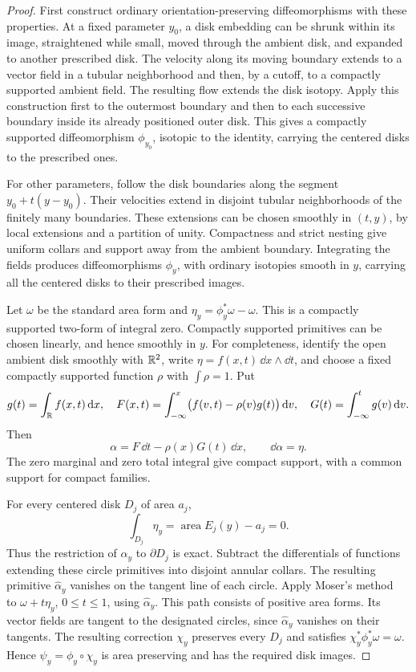 \begin{proof}
First construct ordinary orientation-preserving diffeomorphisms with
these properties. At a fixed parameter \(y_0\), a disk embedding can
be shrunk within its image, straightened while small, moved through
the ambient disk, and expanded to another prescribed disk. The
velocity along its moving boundary extends to a vector field in a
tubular neighborhood and then, by a cutoff, to a compactly supported
ambient field. The resulting flow extends the disk isotopy.
Apply this construction first to the outermost boundary and then to
each successive boundary inside its already positioned outer disk.
This gives a compactly supported diffeomorphism \(\phi_{y_0}\),
isotopic to the identity, carrying the centered disks to the prescribed
ones.

For other parameters, follow the disk boundaries along the segment
\(y_0+t(y-y_0)\). Their velocities extend in disjoint tubular
neighborhoods of the finitely many boundaries. These extensions can
be chosen smoothly in \((t,y)\), by local extensions and a partition
of unity. Compactness and strict nesting give uniform collars and
support away from the ambient boundary. Integrating the fields
produces diffeomorphisms \(\phi_y\), with ordinary isotopies smooth in
\(y\), carrying all the centered disks to their prescribed images.

Let \(\omega\) be the standard area form and
\(\eta_y=\phi_y^*\omega-\omega\).
This is a compactly supported two-form of integral zero.
Compactly supported primitives can be chosen linearly, and hence
smoothly in \(y\). For completeness, identify the open ambient disk
smoothly with \(\mathbb R^2\), write \(\eta=f(x,t)\,\dd x\wedge\dd t\),
and choose a fixed compactly supported function \(\rho\) with
\(\int\rho=1\). Put
\[
 g(t)=\int_\mathbb R f(x,t)\,\mathrm d x,\quad
 F(x,t)=\int_{-\infty}^x\bigl(f(v,t)-\rho(v)g(t)\bigr)\,\mathrm d v,
 \quad G(t)=\int_{-\infty}^t g(v)\,\mathrm d v.
\]
Then
\[
 \alpha=F\,\dd t-\rho(x)G(t)\,\dd x,\qquad
 \dd\alpha=\eta.
\]
The zero marginal and zero total integral give compact support, with
a common support for compact families.

For every centered disk \(D_j\) of area \(a_j\),
\[
 \int_{D_j}\eta_y
 =\operatorname{area}E_j(y)-a_j=0.
\]
Thus the restriction of \(\alpha_y\) to \(\partial D_j\) is exact.
Subtract the differentials of functions extending these circle
primitives into disjoint annular collars. The resulting primitive
\(\widehat\alpha_y\) vanishes on the tangent line of each circle.
Apply Moser's method~\cite{Moser1965} to
\(\omega+t\eta_y\), \(0\le t\le1\), using
\(\widehat\alpha_y\). This path consists of positive area forms.
Its vector fields are tangent to the designated circles, since
\(\widehat\alpha_y\) vanishes on their tangents. The resulting
correction \(\chi_y\) preserves every \(D_j\) and satisfies
\(\chi_y^*\phi_y^*\omega=\omega\).
Hence \(\psi_y=\phi_y\circ\chi_y\) is area preserving and has the
required disk images.


\end{proof}
